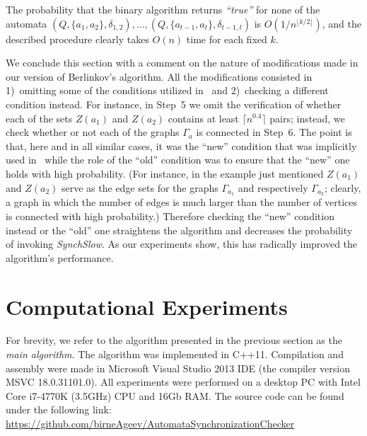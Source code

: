\documentclass{jalc}
\begin{document}
The probability that the binary algorithm returns \emph{``true''} for none of the automata $(Q,\{a_1,a_2\},\delta_{1,2}),\dots,(Q,\{a_{t-1},a_{t}\},\delta_{t-1,t})$ is $O(1/n^{\lfloor k/2 \rfloor})$, and the described procedure clearly takes $O(n)$ time for each fixed $k$.

We conclude this section with a comment on the nature of modifications made in our version of Berlinkov's algorithm. All the modifications consisted in 1)~omitting some of the conditions utilized in~\cite{Berlinkov:preprint} and 2)~checking a different condition instead. For instance, in Step~5 we omit the verification of whether each of the sets $Z(a_1)$ and $Z(a_2)$ contains at least $\lceil n^{0.4}\rceil$ pairs; instead, we check whether or not each of the graphs $\Gamma_a$ is connected in Step~6. The point is that, here and in all similar cases, it was the ``new'' condition that was implicitly used in~\cite{Berlinkov:preprint} while the role of the ``old'' condition was to ensure that the ``new'' one holds with high probability. (For instance, in the example just mentioned $Z(a_1)$ and $Z(a_2)$ serve as the edge sets for the graphs $\Gamma_{a_1}$ and respectively $\Gamma_{a_2}$; clearly, a graph in which the number of edges is much larger than the number of vertices is connected with high probability.) Therefore checking the ``new'' condition instead or the ``old'' one straightens the algorithm and decreases the probability of invoking \emph{SynchSlow}. As our experiments show, this has radically improved the algorithm's performance.


\section{Computational Experiments}

For brevity, we refer to the algorithm presented in the previous section as the \emph{main algorithm}. The algorithm was implemented in C++11. Compilation and assembly were made in Microsoft Visual Studio 2013 IDE (the compiler version MSVC 18.0.31101.0). All experiments were performed on a desktop PC with Intel Core i7-4770K (3.5GHz) CPU and 16Gb RAM. The source code can be found under the following link:\\ \url{https://github.com/birneAgeev/AutomataSynchronizationChecker}
\end{document}
